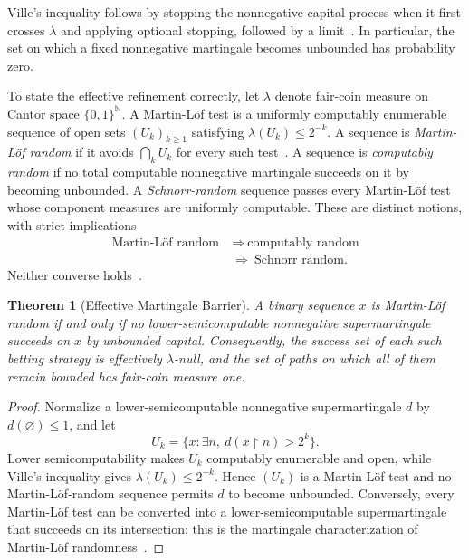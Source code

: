 \documentclass[aps,pra,reprint,superscriptaddress,amsmath,amssymb,floatfix]{revtex4-2}
\theoremstyle{plain}
\newtheorem{theorem}{Theorem}
\theoremstyle{definition}
\theoremstyle{remark}
\begin{document}
Ville's inequality follows by stopping the nonnegative capital process when it
first crosses \(\lambda\) and applying optional stopping, followed by a
limit~\cite{Ville1939}. In particular, the set on which a fixed nonnegative
martingale becomes unbounded has probability zero.

To state the effective refinement correctly, let \(\lambda\) denote fair-coin
measure on Cantor space \(\{0,1\}^{\mathbb N}\). A Martin-L\"of test is a
uniformly computably enumerable sequence of open sets
\((U_k)_{k\geq1}\) satisfying \(\lambda(U_k)\leq2^{-k}\). A sequence is
\emph{Martin-L\"of random} if it avoids \(\bigcap_k U_k\) for every such
test~\cite{MartinLof1966}. A sequence is \emph{computably random} if no total
computable nonnegative martingale succeeds on it by becoming unbounded. A
\emph{Schnorr-random} sequence passes every Martin-L\"of test whose component
measures are uniformly computable. These are distinct notions, with strict
implications
\begin{equation}
  \begin{aligned}
    \text{Martin-L\"of random}
      &\ \Longrightarrow\ \text{computably random}\\
      &\ \Longrightarrow\ \text{Schnorr random}.
  \end{aligned}
  \label{eq:randomhierarchy}
\end{equation}
Neither converse holds~\cite{schnorr1,Nies2009,DH}.

\begin{theorem}[Effective Martingale Barrier]
  \label{thm:effective}
  A binary sequence \(x\) is Martin-L\"of random if and only if no
  lower-semicomputable nonnegative supermartingale succeeds on \(x\) by
  unbounded capital. Consequently, the success set of each such betting
  strategy is effectively \(\lambda\)-null, and the set of paths on which all
  of them remain bounded has fair-coin measure one.
\end{theorem}

\begin{proof}
Normalize a lower-semicomputable nonnegative supermartingale \(d\) by
\(d(\varnothing)\leq1\), and let
\[
  U_k=\{x:\exists n,\ d(x{\upharpoonright}n)>2^k\}.
\]
Lower semicomputability makes \(U_k\) computably enumerable and open, while
Ville's inequality gives \(\lambda(U_k)\leq2^{-k}\). Hence
\((U_k)\) is a Martin-L\"of test and no Martin-L\"of-random sequence permits
\(d\) to become unbounded. Conversely, every Martin-L\"of test can be converted
into a lower-semicomputable supermartingale that succeeds on its intersection;
this is the martingale characterization of Martin-L\"of
randomness~\cite{calude:02,Nies2009}.
\end{proof}
\end{document}
